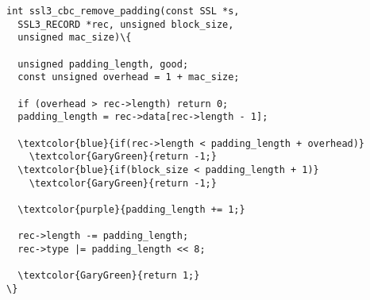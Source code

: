 \begin{minipage}[t]{3.1in}
\small
\begin{Verbatim}
int ssl3_cbc_remove_padding(const SSL *s, 
  SSL3_RECORD *rec, unsigned block_size, 
  unsigned mac_size)\{

  unsigned padding_length, good;
  const unsigned overhead = 1 + mac_size;

  if (overhead > rec->length) return 0;
  padding_length = rec->data[rec->length - 1];

  \textcolor{blue}{if(rec->length < padding_length + overhead)}
    \textcolor{GaryGreen}{return -1;}
  \textcolor{blue}{if(block_size < padding_length + 1)}
    \textcolor{GaryGreen}{return -1;}

  \textcolor{purple}{padding_length += 1;}

  rec->length -= padding_length;
  rec->type |= padding_length << 8;

  \textcolor{GaryGreen}{return 1;}
\}
\end{Verbatim}
\end{minipage}
